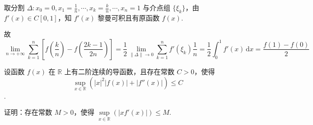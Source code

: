 \documentclass{jhwhw}
\begin{document}
        取分割 $\Delta \colon x_0=0,x_1=\frac{1}{n},\cdots,x_k=\frac{k}{n},\cdots,x_n=1$ 与介点组 $\{\xi_k\}$，由 $f'(x) \in C[0,1]$，知 $f'(x)$ 黎曼可积且有原函数 $f(x)$.

        故 \[
            \lim_{n \to +\infty} \sum_{k=1}^n \left[ f\left(\frac{k}{n}\right) - f\left(\frac{2k-1}{2n}\right) \right]
            = \frac{1}{2} \lim_{\| \Delta \| \to 0} \sum_{k=1}^{n} f'\left(\xi_k\right) \frac{1}{n}
            = \frac{1}{2} \int_{0}^{1} f'(x) \,\text{d}x
            = \frac{f(1)-f(0)}{2}
        \]
    
    
        设函数 $f(x)$ 在 $\mathbb{R}$ 上有二阶连续的导函数，且存在常数 $C>0$，使得
        \[
            \sup_{x \in \mathbb{R}} \left( |x|^2 |f(x)| + |f''(x)| \right) \leq C
        \].

        证明：存在常数 $M>0$，使得 $\sup\limits_{x \in \mathbb{R}} \left(|xf'(x)|\right) \leq M$.
        
\end{document}
